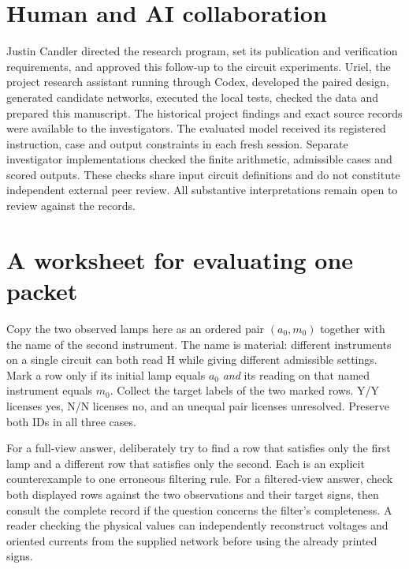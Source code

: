 \documentclass[12pt,letterpaper]{article}
\begin{document}
\section{Human and AI collaboration}\label{collab}

Justin Candler directed the research program, set its publication and verification requirements, and approved this follow-up to the circuit experiments. Uriel, the project research assistant running through Codex, developed the paired design, generated candidate networks, executed the local tests, checked the data and prepared this manuscript. The historical project findings and exact source records were available to the investigators. The evaluated model received its registered instruction, case and output constraints in each fresh session. Separate investigator implementations checked the finite arithmetic, admissible cases and scored outputs. These checks share input circuit definitions and do not constitute independent external peer review. All substantive interpretations remain open to review against the records.

\appendix
\section{A worksheet for evaluating one packet}

Copy the two observed lamps here as an ordered pair $(a_0,m_0)$ together with the name of the second instrument. The name is material: different instruments on a single circuit can both read H while giving different admissible settings. Mark a row only if its initial lamp equals $a_0$ \emph{and} its reading on that named instrument equals $m_0$. Collect the target labels of the two marked rows. Y/Y licenses yes, N/N licenses no, and an unequal pair licenses unresolved. Preserve both IDs in all three cases.

For a full-view answer, deliberately try to find a row that satisfies only the first lamp and a different row that satisfies only the second. Each is an explicit counterexample to one erroneous filtering rule. For a filtered-view answer, check both displayed rows against the two observations and their target signs, then consult the complete record if the question concerns the filter's completeness. A reader checking the physical values can independently reconstruct voltages and oriented currents from the supplied network before using the already printed signs.
\end{document}
